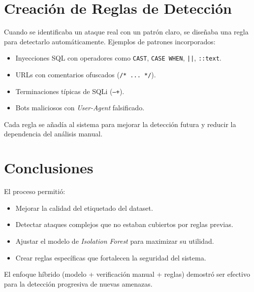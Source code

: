 \documentclass[12pt]{article}
\begin{document}
	  	  \section{Creación de Reglas de Detección} 
	  	  Cuando se identificaba un ataque real con un patrón claro, se diseñaba una regla para detectarlo automáticamente. Ejemplos de patrones incorporados:
	  	   \begin{itemize}
	  	   	 \item Inyecciones SQL con operadores como \texttt{CAST}, \texttt{CASE WHEN}, \texttt{||}, \texttt{::text}.
	  	   	  \item URLs con comentarios ofuscados (\texttt{/* ... */}). 
	  	   	  \item Terminaciones típicas de SQLi (\texttt{--+}). \item Bots maliciosos con \textit{User-Agent}
	  	   	   falsificado.
	  	   	    \end{itemize} 
	  	   	    Cada regla se añadía al sistema para mejorar la detección futura y reducir la dependencia del análisis manual.
	

\section{Conclusiones} El proceso permitió:
 \begin{itemize}
 	 \item Mejorar la calidad del etiquetado del dataset.
 	  \item Detectar ataques complejos que no estaban cubiertos por reglas previas. 
 	  \item Ajustar el modelo de \textit{Isolation Forest} para maximizar su utilidad. 
 	  \item Crear reglas específicas que fortalecen la seguridad del sistema. 
 	  \end{itemize}
 	   El enfoque híbrido (modelo + verificación manual + reglas) demostró ser efectivo para la detección progresiva de nuevas amenazas.
\end{document}
